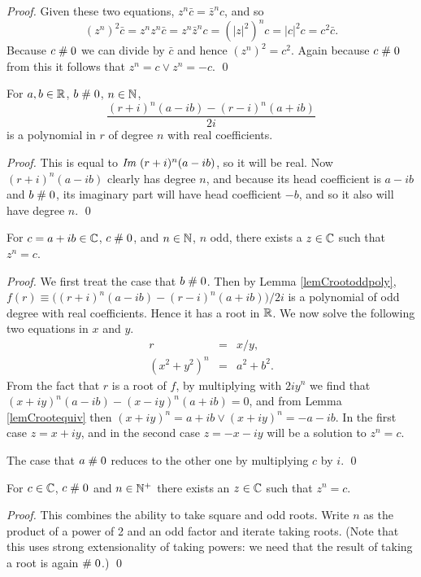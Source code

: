 \begin{proof}
Given these two equations, $z^n \bar{c} = \bar{z}^n c$, and so
$$(z^n)^2 \bar{c} = z^n z^n \bar{c} = z^n \bar{z}^n c = (|z|^2)^n c =
|c|^2 c = c^2 \bar{c}.$$
Because $c\mathrel{\#} 0$ we can divide by $\bar{c}$ and hence
$(z^n)^2 = c^2$.
Again because $c\mathrel{\#} 0$ from this it follows that $z^n = c \vee z^n = -c$.
\qed
\end{proof}

\begin{lemma}\label{lemCrootoddpoly}
For $a, b\in\mathbb{R}$, $b\mathrel{\#} 0$, $n\in\mathbb{N}$, 
$$\frac{(r+i)^n(a-ib)-(r-i)^n(a+ib)}{2i}$$
is a polynomial in $r$ of degree $n$ with real coefficients.
\end{lemma}

\begin{proof}
This is equal to $\mbox{\it Im }(r+i)^n(a-ib)$, so it will be real.
Now $(r+i)^n(a-ib)$ clearly has degree $n$, and because
its head coefficient is
$a-ib$ and $b\mathrel{\#} 0$, its imaginary part will have head coefficient
$-b$, and so it also will have degree $n$.
\qed
\end{proof}


\begin{proposition}
For $c=a+ib\in\mathbb{C}$, $c\mathrel{\#} 0$, and $n\in \mathbb{N}$, $n$ odd, there exists a
$z\in\mathbb{C}$ such that $z^n = c$.
\end{proposition}

\begin{proof}
We first treat the case that $b\mathrel{\#} 0$.
Then by Lemma \ref{lemCrootoddpoly},
$f(r)\equiv\big((r+i)^n(a-ib)-(r-i)^n(a+ib)\big)/2i$
is a polynomial of odd degree
with real coefficients. Hence it has a root in $\mathbb{R}$. We now
solve the following two equations in $x$ and $y$.
\begin{eqnarray*}
  r &=& x/y,\\
  (x^2+y^2)^n &=& a^2+b^2.
\end{eqnarray*}
From the fact that $r$ is a root of $f$, by multiplying with $2iy^n$ we
find that $(x+iy)^n(a-ib)-(x-iy)^n(a+ib)=0$, and
from Lemma \ref{lemCrootequiv} then $(x+iy)^n = a + ib
\vee(x+iy)^n = -a -ib$. In the first case $z=x+iy$, and
in the second case $z=-x-iy$ will be a solution to $z^n=c$.

The case that $a\mathrel{\#} 0$ reduces to the other one by multiplying $c$ by $i$.
\qed
\end{proof}

\begin{theorem}
For $c\in\mathbb{C}$, $c\mathrel{\#} 0$ and $n\in\mathbb{N}^+$ there exists an
$z\in\mathbb{C}$ such that $z^n = c$.
\end{theorem}

\begin{proof}
This combines the ability to take square and odd roots.  Write $n$ as the
product of a power of 2 and an odd factor and iterate taking roots.  (Note that
this uses strong extensionality of taking powers: we need
that the result of taking a root is again $\mathrel{\#} 0$.)
\qed  
\end{proof}


